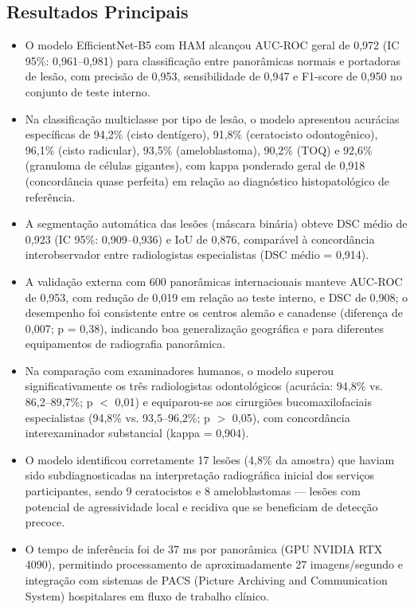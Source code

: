 \subsection{Resultados Principais}
\begin{itemize}
  \item O modelo EfficientNet-B5 com HAM alcançou AUC-ROC geral de
        0,972 (IC 95\%: 0,961--0,981) para classificação entre
        panorâmicas normais e portadoras de lesão, com precisão de
        0,953, sensibilidade de 0,947 e F1-score de 0,950 no
        conjunto de teste interno.
  \item Na classificação multiclasse por tipo de lesão, o modelo
        apresentou acurácias específicas de 94,2\% (cisto dentígero),
        91,8\% (ceratocisto odontogênico), 96,1\% (cisto radicular),
        93,5\% (ameloblastoma), 90,2\% (TOQ) e 92,6\% (granuloma de
        células gigantes), com kappa ponderado geral de 0,918
        (concordância quase perfeita) em relação ao diagnóstico
        histopatológico de referência.
  \item A segmentação automática das lesões (máscara binária)
        obteve DSC médio de 0,923 (IC 95\%: 0,909--0,936) e IoU
        de 0,876, comparável à concordância interobservador entre
        radiologistas especialistas (DSC médio = 0,914).
  \item A validação externa com 600 panorâmicas internacionais
        manteve AUC-ROC de 0,953, com redução de 0,019 em relação
        ao teste interno, e DSC de 0,908; o desempenho foi
        consistente entre os centros alemão e canadense (diferença
        de 0,007; p = 0,38), indicando boa generalização geográfica
        e para diferentes equipamentos de radiografia panorâmica.
  \item Na comparação com examinadores humanos, o modelo superou
        significativamente os três radiologistas odontológicos
        (acurácia: 94,8\% vs. 86,2--89,7\%; p $<$ 0,01) e
        equiparou-se aos cirurgiões bucomaxilofaciais especialistas
        (94,8\% vs. 93,5--96,2\%; p $>$ 0,05), com concordância
        interexaminador substancial (kappa = 0,904).
  \item O modelo identificou corretamente 17 lesões (4,8\% da
        amostra) que haviam sido subdiagnosticadas na interpretação
        radiográfica inicial dos serviços participantes, sendo 9
        ceratocistos e 8 ameloblastomas --- lesões com potencial
        de agressividade local e recidiva que se beneficiam de
        detecção precoce.
  \item O tempo de inferência foi de 37 ms por panorâmica (GPU
        NVIDIA RTX 4090), permitindo processamento de aproximadamente
        27 imagens/segundo e integração com sistemas de PACS
        (Picture Archiving and Communication System) hospitalares
        em fluxo de trabalho clínico.
\end{itemize}

